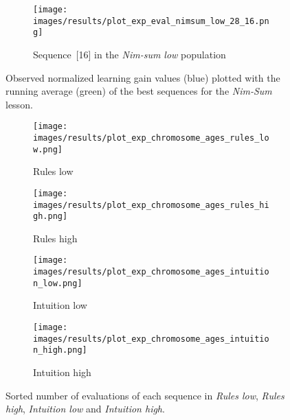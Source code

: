 \begin{figure}[ht]
	\begin{subfigure}{0.9\linewidth}
	\centering
	\texttt{[image: images/results/plot\_exp\_eval\_nimsum\_low\_28\_16.png]}
	\caption{Sequence~[16] in the \emph{Nim-sum low} population}
	\label{fig:exp_eval_nimsum_low_28}
	\end{subfigure}
	\caption{Observed normalized learning gain values (blue) plotted with the
		running average (green) of the best sequences for the \emph{Nim-Sum}
	lesson.}
	\label{fig:exp_eval_nimsum}
\end{figure}
\begin{figure}[ht]
	\begin{subfigure}{0.49\linewidth}
	\centering
	\texttt{[image: images/results/plot\_exp\_chromosome\_ages\_rules\_low.png]}
	\caption{Rules low}
	\label{fig:exp_age_rules_low}
	\end{subfigure}
	\hfill
	\begin{subfigure}{0.49\linewidth}
	\centering
	\texttt{[image: images/results/plot\_exp\_chromosome\_ages\_rules\_high.png]}
	\caption{Rules high}
	\label{fig:exp_age_rules_high}
	\end{subfigure}
	\begin{subfigure}{0.49\linewidth}
	\centering
	\texttt{[image: images/results/plot\_exp\_chromosome\_ages\_intuition\_low.png]}
	\caption{Intuition low}
	\label{fig:exp_age_intuition_low}
	\end{subfigure}
	\hfill
	\begin{subfigure}{0.49\linewidth}
	\centering
	\texttt{[image: images/results/plot\_exp\_chromosome\_ages\_intuition\_high.png]}
	\caption{Intuition high}
	\label{fig:exp_age_intuition_high}
	\end{subfigure}
	\caption{Sorted number of evaluations of each sequence in \emph{Rules
	low}, \emph{Rules high}, \emph{Intuition low} and \emph{Intuition high}.}
	\label{fig:exp_ages1}
\end{figure}

